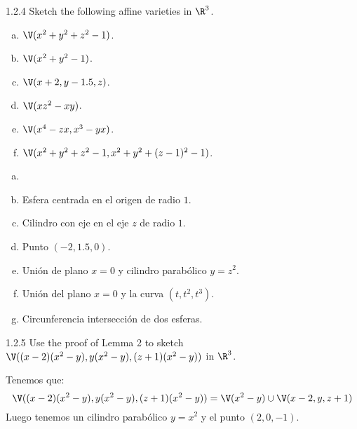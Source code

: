 \documentclass[twoside]{article}
\begin{document}
\newpage

\begin{ejercicio}{1.2.4}
Sketch the following affine varieties in $\R^3$.
\begin{enumerate}[a.]
\item $\V(x^2+y^2+z^2-1)$.
\item $\V(x^2+y^2-1)$.
\item $\V(x+2,y-1.5,z)$.
\item $\V(xz^2-xy)$.
\item $\V(x^4-zx,x^3-yx)$.
\item $\V(x^2+y^2+z^2-1, x^2+y^2+(z-1)^2-1)$.
\end{enumerate}
\end{ejercicio}
\begin{solucion}
\begin{enumerate}[a.]
\item[]
\item Esfera centrada en el origen de radio $1$.
\item Cilindro con eje en el eje $z$ de radio $1$.
\item Punto $(-2,1.5,0)$.
\item Unión de plano $x=0$ y cilindro parabólico $y=z^2$.
\item Unión del plano $x=0$ y la curva $(t,t^2,t^3)$.
\item Circunferencia intersección de dos esferas.
\end{enumerate}
\end{solucion}

\newpage


\begin{ejercicio}{1.2.5}
Use the proof of Lemma 2 to sketch $\V((x-2)(x^2-y),y(x^2-y),(z+1)(x^2-y))$ in $\R^3$.
\end{ejercicio}
\begin{solucion}
Tenemos que:
\[ \V((x-2)(x^2-y),y(x^2-y),(z+1)(x^2-y)) = \V(x^2-y) \cup \V(x-2,y,z+1) \]
Luego tenemos un cilindro parabólico $y=x^2$ y el punto $(2,0,-1)$.
\end{solucion}

\newpage
\end{document}
